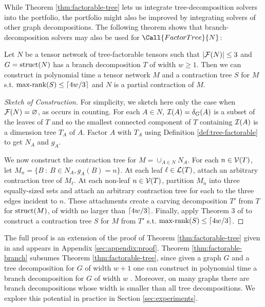 While Theorem \ref{thm:factorable-tree} lets us integrate tree-decomposition solvers into the portfolio, the portfolio might also be improved by integrating solvers of other graph decompositions. The following theorem shows that branch-decomposition solvers may also be used for $\Call{FactorTree}{N}$:
\begin{theorem} \label{thm:factorable-branch}
Let $N$ be a tensor network of tree-factorable tensors such that $|\mathcal{F}(N)| \leq 3$ and $G=\text{struct}(N)$ has a branch decomposition $T$ of width $w \geq 1$. Then we can construct in polynomial time a tensor network $M$ and a contraction tree $S$ for $M$ s.t. $\text{max-rank}(S) \leq \lceil4w/3\rceil$ and $N$ is a partial contraction of $M$.
\end{theorem}
\begin{proof}[Sketch of Construction]
For simplicity, we sketch here only the case when $\mathcal{F}(N) = \varnothing$, as occurs in counting. For each $A \in N$, $\mathcal{I}(A) = \delta_{G}(A)$ is a subset of the leaves of $T$ and so the smallest connected component of $T$ containing $\mathcal{I}(A)$ is a dimension tree $T_A$ of $A$. Factor $A$ with $T_A$ using Definition \ref{def:tree-factorable} to get $N_A$ and $g_A$.

We now construct the contraction tree for $M = \cup_{A \in N} N_A$. For each $n \in \mathcal{V}(T)$, let $M_n = \{B~:~B \in N_A, g_A(B) = n\}$. At each leaf $\ell \in \mathcal{L}(T)$, attach an arbitrary contraction tree of $M_\ell$. At each non-leaf $n \in \mathcal{V}(T)$, partition $M_n$ into three equally-sized sets and attach an arbitrary contraction tree for each to the three edges incident to $n$. These attachments create a carving decomposition $T'$ from $T$ for $\text{struct}(M)$, of width no larger than $\lceil4w/3\rceil$. Finally, apply Theorem 3 of \cite{DDV19} to construct a contraction tree $S$ for $M$ from $T'$ s.t. $\text{max-rank}(S) \leq \lceil4w/3\rceil$.
\end{proof}

The full proof is an extension of the proof of Theorem \ref{thm:factorable-tree} given in \cite{DDV19} and appears in Appendix \ref{sec:appendix:proof}.
Theorem \ref{thm:factorable-branch} subsumes Theorem \ref{thm:factorable-tree}, since given a graph $G$ and a tree decomposition for $G$ of width $w+1$ one can construct in polynomial time a branch decomposition for $G$ of width $w$ \cite{RS91}. Moreover, on many graphs there are branch decompositions whose width is smaller than all tree decompositions. We explore this potential in practice in Section \ref{sec:experiments}.

